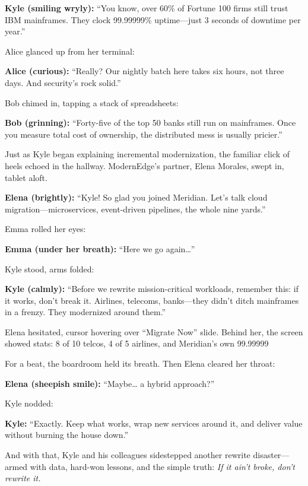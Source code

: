 \medskip

\textbf{Kyle (smiling wryly):} “You know, over 60\% of Fortune 100 firms still  
trust IBM mainframes. They clock 99.99999\% uptime—just 3 seconds of downtime  
per year.”

\medskip

Alice glanced up from her terminal:

\medskip

\textbf{Alice (curious):} “Really? Our nightly batch here takes six hours,  
not three days. And security’s rock solid.”

\medskip

Bob chimed in, tapping a stack of spreadsheets:

\medskip

\textbf{Bob (grinning):} “Forty-five of the top 50 banks still run on  
mainframes. Once you measure total cost of ownership, the distributed mess  
is usually pricier.”

\medskip

Just as Kyle began explaining incremental modernization, the familiar click  
of heels echoed in the hallway. ModernEdge’s partner, Elena Morales, swept in,  
tablet aloft.

\medskip

\textbf{Elena (brightly):} “Kyle! So glad you joined Meridian. Let’s talk cloud  
migration—microservices, event-driven pipelines, the whole nine yards.”

\medskip

Emma rolled her eyes:

\medskip

\textbf{Emma (under her breath):} “Here we go again…”

\medskip

Kyle stood, arms folded:

\medskip

\textbf{Kyle (calmly):} “Before we rewrite mission-critical workloads, remember  
this: if it works, don’t break it. Airlines, telecoms, banks—they didn’t ditch  
mainframes in a frenzy. They modernized around them.”

\medskip

Elena hesitated, cursor hovering over “Migrate Now” slide. Behind her, the  
screen showed stats: 8 of 10 telcos, 4 of 5 airlines, and Meridian’s own  
99.99999 %

\medskip

For a beat, the boardroom held its breath. Then Elena cleared her throat:

\medskip

\textbf{Elena (sheepish smile):} “Maybe… a hybrid approach?”

\medskip

Kyle nodded:

\medskip

\textbf{Kyle:} “Exactly. Keep what works, wrap new services around it, and  
deliver value without burning the house down.”

\medskip

And with that, Kyle and his colleagues sidestepped another rewrite disaster—  
armed with data, hard-won lessons, and the simple truth: \emph{If it ain’t broke,  
don’t rewrite it.}  


